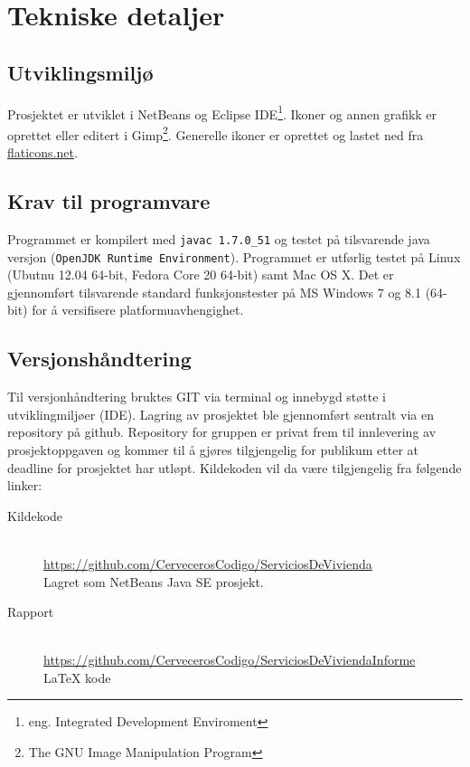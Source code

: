 \section{Tekniske detaljer}

\subsection{Utviklingsmiljø}
Prosjektet er utviklet i NetBeans og Eclipse IDE\footnote{eng. Integrated Development Enviroment}. Ikoner og annen grafikk er oprettet eller editert i Gimp\footnote{The GNU Image Manipulation Program}. Generelle ikoner er oprettet og lastet ned fra \href{http://www.flaticons.net}{flaticons.net}.

\subsection{Krav til programvare}
Programmet er kompilert med \texttt{javac 1.7.0\_51} og testet på tilsvarende java versjon (\texttt{OpenJDK Runtime Environment}). Programmet er utførlig testet på Linux (Ubutnu 12.04 64-bit, Fedora Core 20 64-bit) samt Mac OS X. Det er gjennomført tilsvarende standard funksjonstester på MS Windows 7 og 8.1 (64-bit) for å versifisere platformuavhengighet. 

\subsection{Versjonshåndtering}
Til versjonhåndtering bruktes GIT via terminal og innebygd støtte i utviklingmiljøer (IDE). Lagring av prosjektet ble gjennomført sentralt via en repository på github. Repository for gruppen er privat frem til innlevering av prosjektoppgaven og kommer til å gjøres tilgjengelig for publikum etter at deadline for prosjektet har utløpt. Kildekoden vil da være tilgjengelig fra følgende linker:

\begin{description}
\item[Kildekode]
\hfill \\
\url{https://github.com/CervecerosCodigo/ServiciosDeVivienda}
\\Lagret som NetBeans Java SE prosjekt.

\item[Rapport]
\hfill \\
\url{https://github.com/CervecerosCodigo/ServiciosDeViviendaInforme}
\\ \LaTeX{} kode
\end{description}